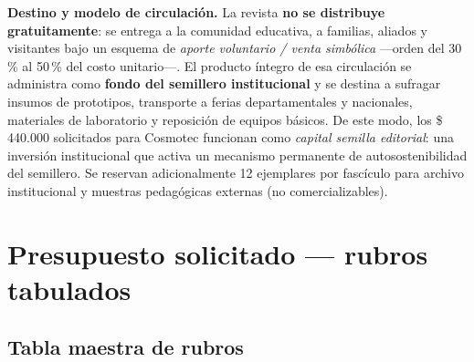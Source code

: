 \documentclass[12pt, letterpaper]{article}
\newcommand{\pesos}[1]{\$\,#1}
\begin{document}
\textbf{Destino y modelo de circulación.} La revista \textbf{no se distribuye gratuitamente}: se entrega a la comunidad educativa, a familias, aliados y visitantes bajo un esquema de \textit{aporte voluntario / venta simbólica} —orden del 30\,\% al 50\,\% del costo unitario—. El producto íntegro de esa circulación se administra como \textbf{fondo del semillero institucional} y se destina a sufragar insumos de prototipos, transporte a ferias departamentales y nacionales, materiales de laboratorio y reposición de equipos básicos. De este modo, los \pesos{440.000} solicitados para Cosmotec funcionan como \textit{capital semilla editorial}: una inversión institucional que activa un mecanismo permanente de autosostenibilidad del semillero. Se reservan adicionalmente 12 ejemplares por fascículo para archivo institucional y muestras pedagógicas externas (no comercializables).

\section{Presupuesto solicitado — rubros tabulados}

\subsection{Tabla maestra de rubros}
\end{document}
